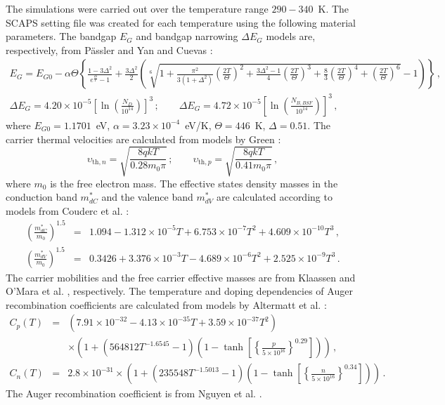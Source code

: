 \documentclass[a4paper,fleqn]{cas-sc}
\begin{document}
The simulations  were carried out over the temperature range $290-340$~K.
The SCAPS setting file was created for each temperature using the following material parameters.
The bandgap $E_G$ and bandgap narrowing $\Delta E_G$ models are, respectively, from P\"{a}ssler \citep{Pasler} and Yan and Cuevas \citep{EgNarrow}:
\begin{eqnarray}
\label{eqEg}
E_G=E_{G0}-\alpha\Theta\left\{\frac{1-3\Delta^2}{e^{\frac{\Theta}{T}}-1}
    +\frac{3\Delta^2}{2}\left(\sqrt[6]{1+\frac{\pi^2}{3(1+\Delta^2)}\left(\frac{2T}{\Theta}\right)^2
    +\frac{3\Delta^2-1}{4}\left(\frac{2T}{\Theta}\right)^3+\frac{8}{3}\left(\frac{2T}{\Theta}\right)^4
    +\left(\frac{2T}{\Theta}\right)^6}-1\right)\right\}\,,\\
\Delta E_G=4.20\times10^{-5}\left[\ln\left(\frac{N_{D}}{10^{14}}\right)\right]^3\,;\qquad
     \Delta E_G=4.72\times10^{-5}\left[\ln\left(\frac{N_{B,BSF}}{10^{14}}\right)\right]^3\,,
\end{eqnarray}
where
$E_{G0}=1.1701$~eV,
$\alpha=3.23\times10^{-4}$~eV/K,
$\Theta=446$~K,
$\Delta=0.51$.
The carrier thermal velocities are calculated from models by Green \citep{Nc:Green}:
\begin{equation}
\label{eqVth}
    \upsilon_{\mathrm{th},n}=\sqrt{\frac{8qkT}{0.28m_0\pi}}\,;\qquad
    \upsilon_{\mathrm{th},p}=\sqrt{\frac{8qkT}{0.41m_0\pi}}\,,
\end{equation}
where
$m_0$ is the free electron mass.
The effective states density masses in the conduction band $m^*_{dC}$ and
the valence band $m^*_{dV}$ are calculated according to models from Couderc et al. \citep{Si_ni_Couderc}:
\begin{eqnarray}
  \left(\frac{m^*_{dC}}{m_0}\right)^{1.5} &=& 1.094-1.312\times10^{-5}T+6.753\times10^{-7}T^2+4.609\times10^{-10}T^3\,, \\
  \left(\frac{m^*_{dV}}{m_0}\right)^{1.5} &=& 0.3426+3.376\times10^{-3}T-4.689\times10^{-6}T^2+2.525\times10^{-9}T^3\,.
\end{eqnarray}
The carrier mobilities and the free carrier effective masses are from Klaassen \citep{KLAASSEN953}
and O'Mara et al. \citep{OMara}, respectively.
The temperature and doping dependencies of Auger recombination coefficients are calculated from models by Altermatt et al. \citep{Si_Auger}:
\begin{eqnarray}
   \nonumber C_{p} (T)&=& (7.91\times10^{-32}-4.13\times10^{-35}T+3.59\times10^{-37}T^2)\\
  &&\times\left(1+\left(564812T^{-1.6545}-1\right)\left(1-\tanh\left[\left\{\frac{p}{5\times10^{16}}\right\}^{0.29}\right]\right)\right)\,, \\
   C_{n} (T)&=& 2.8\times10^{-31}
  \times\left(1+\left(235548T^{-1.5013}-1\right)\left(1-\tanh\left[\left\{\frac{n}{5\times10^{16}}\right\}^{0.34}\right]\right)\right)\,.
\end{eqnarray}
The Auger recombination coefficient is from Nguyen et al. \citep{Si_BtB}.
\end{document}
